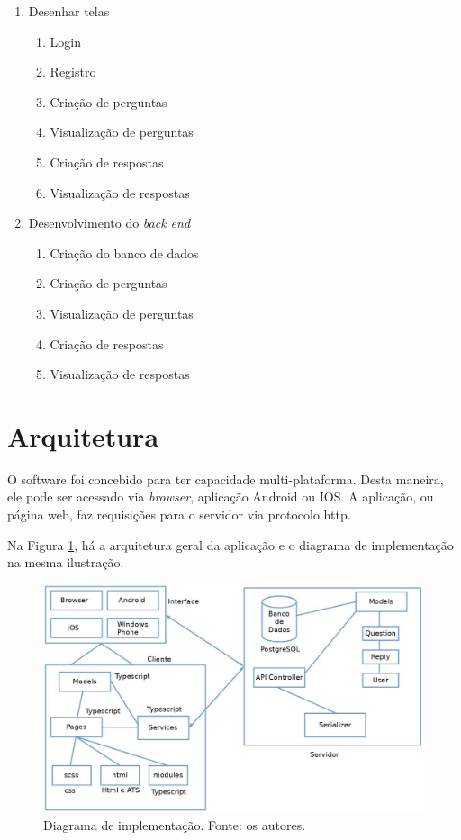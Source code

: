 \begin{enumerate}
\item Desenhar telas
\begin{enumerate}
\item Login
\item Registro
\item Criação de perguntas
\item Visualização de perguntas
\item Criação de respostas
\item Visualização de respostas
\end{enumerate}
\item Desenvolvimento do \emph{back end}
\begin{enumerate}
\item Criação do banco de dados
\item Criação de perguntas
\item Visualização de perguntas
\item Criação de respostas
\item Visualização de respostas
\end{enumerate}
\end{enumerate}



\section{Arquitetura}


O software foi concebido para ter capacidade multi-plataforma. Desta maneira, ele pode ser acessado via \emph{browser}, aplicação Android ou IOS. A aplicação, ou página web, faz requisições para o servidor via protocolo http.

Na Figura \ref{fig:arquitetura}, há a arquitetura geral da aplicação e o diagrama de implementação na mesma ilustração.

\begin{figure}[!htb]
\centering
\includegraphics[width=14cm]{arquitetura.png}
\caption{Diagrama de implementação. Fonte: os autores.}
\label{fig:arquitetura}
\end{figure}

